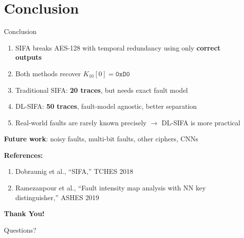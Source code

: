 \documentclass[aspectratio=169]{beamer}
\begin{document}
\section{Conclusion}
\begin{frame}{Conclusion}
\begin{enumerate}
    \item SIFA breaks AES-128 with temporal redundancy using only \textbf{correct outputs}
    \item Both methods recover $K_{10}[0] = \texttt{0xD0}$
    \item Traditional SIFA: \textbf{20 traces}, but needs exact fault model
    \item DL-SIFA: \textbf{50 traces}, fault-model agnostic, better separation
    \item Real-world faults are rarely known precisely $\rightarrow$ DL-SIFA is more practical
\end{enumerate}

\vspace{0.3cm}
\textbf{Future work}: noisy faults, multi-bit faults, other ciphers, CNNs

\vspace{0.4cm}
\small\textbf{References:}
\begin{enumerate}\small
    \item Dobraunig et al., ``SIFA,'' TCHES 2018
    \item Ramezanpour et al., ``Fault intensity map analysis with NN key distinguisher,'' ASHES 2019
\end{enumerate}
\end{frame}

\begin{frame}{}
\vfill
\begin{center}
\Huge \textbf{Thank You!}

\vspace{0.8cm}
\Large Questions?
\end{center}
\vfill
\end{frame}
\end{document}
